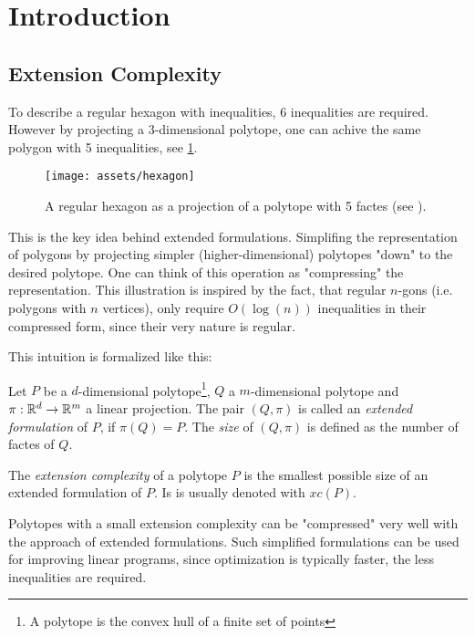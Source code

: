 \section{Introduction} 

\subsection{Extension Complexity}

To describe a regular hexagon with inequalities, 6 inequalities are required. However by projecting a 3-dimensional polytope, one can achive the same polygon with 5 inequalities, see \ref{fig:hexagon}. 

\begin{figure}[h]
  \centering
  \texttt{[image: assets/hexagon]}
  \caption{A regular hexagon as a projection of a polytope with 5 factes (see \cite{kwan2020extension}).}
  \label{fig:hexagon}
\end{figure}

This is the key idea behind extended formulations. Simplifing the representation of polygons by projecting simpler (higher-dimensional) polytopes "down" to the desired polytope.
One can think of this operation as "compressing" the representation. This illustration is inspired by the fact, that regular $n$-gons (i.e. polygons with $n$ vertices), only require $O(\log(n))$ inequalities in their compressed form, since their very nature is regular.

This intuition is formalized like this:

\begin{definition}
  Let $P$ be a $d$-dimensional polytope\footnote{A polytope is the convex hull of a finite set of points}, $Q$ a $m$-dimensional polytope and $\pi:\mathbb{R}^d \to \mathbb{R}^m$ a linear projection.
  The pair $(Q,\pi)$ is called an \textit{extended formulation} of $P$, if $\pi(Q)=P$. The \textit{size} of $(Q,\pi)$ is defined as the number of factes of $Q$.
\end{definition}

\begin{definition}
  The \textit{extension complexity} of a polytope $P$ is the smallest possible size of an extended formulation of $P$. Is is usually denoted with $xc(P)$.
\end{definition}

Polytopes with a small extension complexity can be "compressed" very well with the approach of extended formulations.
Such simplified formulations can be used for improving linear programs, since optimization is typically faster, the less inequalities are required.



